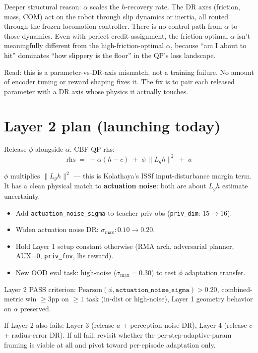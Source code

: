 \documentclass[11pt]{article}
\begin{document}
Deeper structural reason: $\alpha$ scales the $h$-recovery rate. The DR axes (friction, mass, COM) act on the robot through slip dynamics or inertia, all routed through the frozen locomotion controller. There is no control path from $\alpha$ to those dynamics. Even with perfect credit assignment, the friction-optimal $\alpha$ isn't meaningfully different from the high-friction-optimal $\alpha$, because ``am I about to hit'' dominates ``how slippery is the floor'' in the QP's loss landscape.

Read: this is a parameter-vs-DR-axis mismatch, not a training failure. No amount of encoder tuning or reward shaping fixes it. The fix is to pair each released parameter with a DR axis whose physics it actually touches.

\section*{Layer 2 plan (launching today)}

Release $\phi$ alongside $\alpha$. CBF QP rhs:
\begin{equation}
\text{rhs} \;=\; -\alpha(h - c) \;+\; \phi \,\|L_g h\|^2 \;+\; a
\end{equation}

$\phi$ multiplies $\|L_g h\|^2$ --- this is Kolathaya's ISSf input-disturbance margin term. It has a clean physical match to \textbf{actuation noise}: both are about $L_g h$ estimate uncertainty.

\begin{itemize}
\item Add \texttt{actuation\_noise\_sigma} to teacher priv obs (\texttt{priv\_dim}: $15 \to 16$).
\item Widen actuation noise DR: $\sigma_{\max}: 0.10 \to 0.20$.
\item Hold Layer 1 setup constant otherwise (RMA arch, adversarial planner, AUX=0, \texttt{priv\_fov}, lhs reward).
\item New OOD eval task: high-noise ($\sigma_{\max}=0.30$) to test $\phi$ adaptation transfer.
\end{itemize}

Layer 2 PASS criterion: $\text{Pearson}(\phi, \texttt{actuation\_noise\_sigma}) > 0.20$, combined-metric win $\geq 3$pp on $\geq 1$ task (in-dist or high-noise), Layer 1 geometry behavior on $\alpha$ preserved.

If Layer 2 also fails: Layer 3 (release $a$ + perception-noise DR), Layer 4 (release $c$ + radius-error DR). If all fail, revisit whether the per-step-adaptive-param framing is viable at all and pivot toward per-episode adaptation only.
\end{document}

